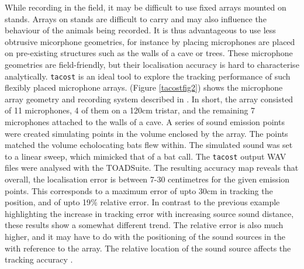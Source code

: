 \documentclass[
]{book}
\begin{document}
While recording in the field, it may be difficult to use fixed arrays mounted on stands. Arrays on stands are difficult to carry and may also influence the behaviour of the animals being recorded. It is thus advantageous to use less obtrusive micorphone geometries, for instance by placing microphones are placed on pre-existing structures such as the walls of a cave or trees. These microphone geometries are field-friendly, but their localisation accuracy is hard to characterise analytically. \texttt{tacost} is an ideal tool to explore the tracking performance of such flexibly placed microphone arrays. (Figure \ref{tacostfig2}) shows the microphone array geometry and recording system described in \citep{Batstone2019}. In short, the array consisted of 11 microphones, 4 of them on a 120cm tristar, and the remaining 7 microphones attached to the walls of a cave. A series of sound emission points were created simulating points in the volume enclosed by the array. The points matched the volume echolocating bats flew within. The simulated sound was set to a linear sweep, which mimicked that of a bat call. The \texttt{tacost} output WAV files were analysed with the TOADSuite. The resulting accuracy map reveals that overall, the localisation error is between 7-30 centimetres for the given emission points. This corresponds to a maximum error of upto 30cm in tracking the position, and of upto 19\(\%\) relative error. In contrast to the previous example highlighting the increase in tracking error with increasing source sound distance, these results show a somewhat different trend. The relative error is also much higher, and it may have to do with the positioning of the sound sources in the with reference to the array. The relative location of the sound source affects the tracking accuracy \citep{aubauer1996acoustical}.
\end{document}
